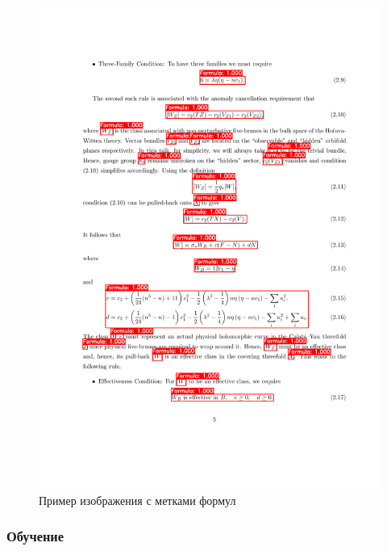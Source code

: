\begin{figure}
    \includegraphics[scale=0.5]{img/dataset/parsed.png}
    \caption{Пример изображения с метками формул}
    \label{dataset_output}
\end{figure}

\subsubsection{Обучение}

